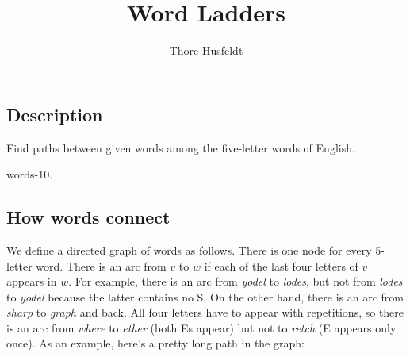 \documentclass{tufte-handout}
\title{Word Ladders}
\author{Thore Husfeldt}
\begin{document}
\maketitle

\subsection{Description}
Find paths between given words among the five-letter words of English.

\begin{marginfigure}
  \caption{words-10.}
\end{marginfigure}

\subsection{How words connect}

We define a directed graph of words as follows.
There is one node for every 5-letter word.
There is an arc from $v$ to $w$ if each of the last four letters of $v$ appears in $w$.
For example, there is an arc from \emph{yodel} to \emph{lodes}, but not from \emph{lodes} to \emph{yodel} because the latter contains no S. 
On the other hand, there is an arc from \emph{sharp} to \emph{graph} and back. 
All four letters have to appear with repetitions, so there is an arc from \emph{where} to \emph{ether} (both Es appear) but not to \emph{retch} (E appears only once).
As an example, here’s a pretty long path in the graph: 
\bigskip
\end{document}
